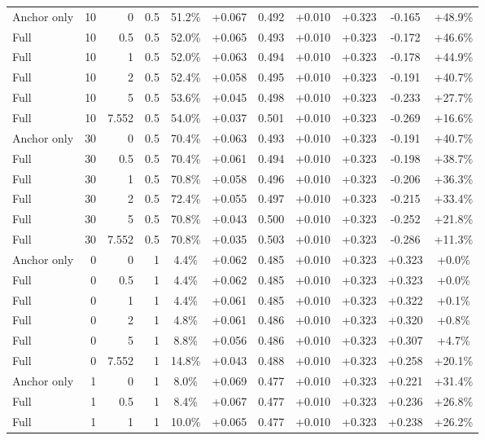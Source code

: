 \begin{table}[htbp]
\begin{tabular}{lrrrccccccc}
Anchor only & 10 & 0 & 0.5 & 51.2\% & +0.067 & 0.492 & +0.010 & +0.323 & -0.165 & +48.9\% \\
Full & 10 & 0.5 & 0.5 & 52.0\% & +0.065 & 0.493 & +0.010 & +0.323 & -0.172 & +46.6\% \\
Full & 10 & 1 & 0.5 & 52.0\% & +0.063 & 0.494 & +0.010 & +0.323 & -0.178 & +44.9\% \\
Full & 10 & 2 & 0.5 & 52.4\% & +0.058 & 0.495 & +0.010 & +0.323 & -0.191 & +40.7\% \\
Full & 10 & 5 & 0.5 & 53.6\% & +0.045 & 0.498 & +0.010 & +0.323 & -0.233 & +27.7\% \\
Full & 10 & 7.552 & 0.5 & 54.0\% & +0.037 & 0.501 & +0.010 & +0.323 & -0.269 & +16.6\% \\
Anchor only & 30 & 0 & 0.5 & 70.4\% & +0.063 & 0.493 & +0.010 & +0.323 & -0.191 & +40.7\% \\
Full & 30 & 0.5 & 0.5 & 70.4\% & +0.061 & 0.494 & +0.010 & +0.323 & -0.198 & +38.7\% \\
Full & 30 & 1 & 0.5 & 70.8\% & +0.058 & 0.496 & +0.010 & +0.323 & -0.206 & +36.3\% \\
Full & 30 & 2 & 0.5 & 72.4\% & +0.055 & 0.497 & +0.010 & +0.323 & -0.215 & +33.4\% \\
Full & 30 & 5 & 0.5 & 70.8\% & +0.043 & 0.500 & +0.010 & +0.323 & -0.252 & +21.8\% \\
Full & 30 & 7.552 & 0.5 & 70.8\% & +0.035 & 0.503 & +0.010 & +0.323 & -0.286 & +11.3\% \\
Anchor only & 0 & 0 & 1 & 4.4\% & +0.062 & 0.485 & +0.010 & +0.323 & +0.323 & +0.0\% \\
Full & 0 & 0.5 & 1 & 4.4\% & +0.062 & 0.485 & +0.010 & +0.323 & +0.323 & +0.0\% \\
Full & 0 & 1 & 1 & 4.4\% & +0.061 & 0.485 & +0.010 & +0.323 & +0.322 & +0.1\% \\
Full & 0 & 2 & 1 & 4.8\% & +0.061 & 0.486 & +0.010 & +0.323 & +0.320 & +0.8\% \\
Full & 0 & 5 & 1 & 8.8\% & +0.056 & 0.486 & +0.010 & +0.323 & +0.307 & +4.7\% \\
Full & 0 & 7.552 & 1 & 14.8\% & +0.043 & 0.488 & +0.010 & +0.323 & +0.258 & +20.1\% \\
Anchor only & 1 & 0 & 1 & 8.0\% & +0.069 & 0.477 & +0.010 & +0.323 & +0.221 & +31.4\% \\
Full & 1 & 0.5 & 1 & 8.4\% & +0.067 & 0.477 & +0.010 & +0.323 & +0.236 & +26.8\% \\
Full & 1 & 1 & 1 & 10.0\% & +0.065 & 0.477 & +0.010 & +0.323 & +0.238 & +26.2\% \\

\end{tabular}
\end{table}
